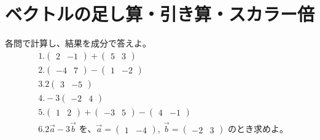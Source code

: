 \documentclass[paper=b4j,landscape,twocolumn,fleqn]{jlreq}
\begin{document}
\section{ベクトルの足し算・引き算・スカラー倍}
各問で計算し、結果を成分で答えよ。
\begin{align*}
　&1.　\begin{pmatrix}2 & -1\end{pmatrix}+\begin{pmatrix}5 & 3\end{pmatrix}\\[0.45em]
　&2.　\begin{pmatrix}-4 & 7\end{pmatrix}-\begin{pmatrix}1 & -2\end{pmatrix}\\[0.45em]
　&3.　2\begin{pmatrix}3 & -5\end{pmatrix}\\[0.45em]
　&4.　-3\begin{pmatrix}-2 & 4\end{pmatrix}\\[0.45em]
　&5.　\begin{pmatrix}1 & 2\end{pmatrix}+\begin{pmatrix}-3 & 5\end{pmatrix}-\begin{pmatrix}4 & -1\end{pmatrix}\\[0.45em]
　&6.　2\vec{a}-3\vec{b}\text{ を、}\vec{a}=\begin{pmatrix}1 & -4\end{pmatrix},\ \vec{b}=\begin{pmatrix}-2 & 3\end{pmatrix}\text{ のとき求めよ。}\\[0.45em]
\end{align*}

\newpage
\end{document}
